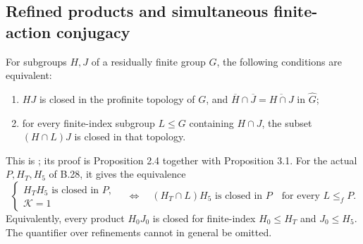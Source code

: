 \subsection*{Refined products and simultaneous finite-action conjugacy}

For subgroups $H,J$ of a residually finite group $G$, the
following conditions are equivalent:
\begin{enumerate}
\item $HJ$ is closed in the profinite topology of $G$, and
$\overline H\cap\overline J=\overline{H\cap J}$ in $\widehat G$;
\item for every finite-index subgroup $L\leq G$ containing
$H\cap J$, the subset $(H\cap L)J$ is closed in that topology.
\end{enumerate}
This is \citet[Theorem 1.1]{DE_Minasyan2023}; its proof is
Proposition 2.4 together with Proposition 3.1.
For the actual $P,H_T,H_5$ of B.28, it gives the equivalence
\[
 \left\{\begin{array}{c}
 H_TH_5\text{ is closed in }P,\\
 \mathcal K=1
 \end{array}\right.
 \quad\Longleftrightarrow\quad
 (H_T\cap L)H_5\text{ is closed in }P
 \quad\text{for every }L\leq_f P.
\]
Equivalently, every product $H_0J_0$ is closed for finite-index
$H_0\leq H_T$ and $J_0\leq H_5$.
The quantifier over refinements cannot in general be omitted.
